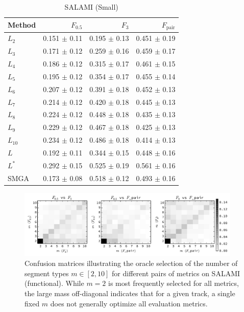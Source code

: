 \documentclass{article}
\begin{document}
\begin{table}
\centering
\caption{ SALAMI (Small)\label{results:salami:small}}
\small
\begin{tabular}{lrrr}
\toprule
Method & $F_{0.5}$ & $F_3$ & $F_\text{pair}$\\
\midrule
$L_2$   & 0.151 $\pm$ 0.11 & 0.195 $\pm$ 0.13   & 0.451 $\pm$ 0.19\\
$L_3$   & 0.171 $\pm$ 0.12 & 0.259 $\pm$ 0.16   & 0.459 $\pm$ 0.17\\
$L_4$   & 0.186 $\pm$ 0.12 & 0.315 $\pm$ 0.17   & 0.461 $\pm$ 0.15\\
$L_5$   & 0.195 $\pm$ 0.12 & 0.354 $\pm$ 0.17   & 0.455 $\pm$ 0.14\\
$L_6$   & 0.207 $\pm$ 0.12 & 0.391 $\pm$ 0.18   & 0.452 $\pm$ 0.13\\
$L_7$   & 0.214 $\pm$ 0.12 & 0.420 $\pm$ 0.18   & 0.445 $\pm$ 0.13\\
$L_8$   & 0.224 $\pm$ 0.12 & 0.448 $\pm$ 0.18   & 0.435 $\pm$ 0.13\\
$L_9$   & 0.229 $\pm$ 0.12 & 0.467 $\pm$ 0.18   & 0.425 $\pm$ 0.13\\
$L_{10}$& 0.234 $\pm$ 0.12 & 0.486 $\pm$ 0.18   & 0.414 $\pm$ 0.13\\
\midrule
$L$     & 0.192 $\pm$ 0.11 & 0.344 $\pm$ 0.15   & 0.448 $\pm$ 0.16\\
$L^*$   & 0.292 $\pm$ 0.15 & 0.525 $\pm$ 0.19   & 0.561 $\pm$ 0.16\\
\midrule
SMGA    & 0.173 $\pm$ 0.08 & 0.518 $\pm$ 0.12   & 0.493 $\pm$ 0.16\\
\bottomrule
\end{tabular}
\end{table}

\begin{figure}
\centering
\includegraphics[width=0.95\textwidth]{figs/mconfusionfunc}
\caption{Confusion matrices illustrating the oracle selection of the number of segment
types $m\in [2, 10]$ for different pairs of metrics on SALAMI (functional). 
While $m=2$ is most frequently selected for all metrics, the large mass off-diagonal 
indicates that for a given track, a single fixed $m$ does not generally optimize all 
evaluation metrics.\label{mconfusion}}
\end{figure}
\end{document}
